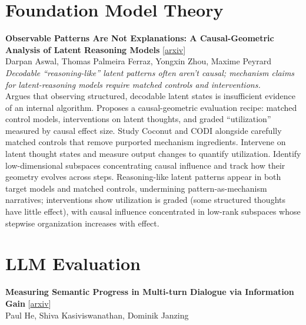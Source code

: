 \documentclass[12pt,letterpaper]{article}
\begin{document}
\medskip


\section*{Foundation Model Theory}

{\small\textbf{Observable Patterns Are Not Explanations: A Causal-Geometric Analysis of Latent Reasoning Models}} {\scriptsize[\href{https://arxiv.org/abs/2606.12689}{arxiv}]}\\
{\scriptsize Darpan Aswal, Thomas Palmeira Ferraz, Yongxin Zhou, Maxime Peyrard}\\

{\small\textit{Decodable ``reasoning-like'' latent patterns often aren't causal; mechanism claims for latent-reasoning models require matched controls and interventions.}}\\[1pt]
{\footnotesize Argues that observing structured, decodable latent states is insufficient evidence of an internal algorithm. Proposes a causal-geometric evaluation recipe: matched control models, interventions on latent thoughts, and graded ``utilization'' measured by causal effect size. Study Coconut and CODI alongside carefully matched controls that remove purported mechanism ingredients. Intervene on latent thought states and measure output changes to quantify utilization. Identify low-dimensional subspaces concentrating causal influence and track how their geometry evolves across steps. Reasoning-like latent patterns appear in both target models and matched controls, undermining pattern-as-mechanism narratives; interventions show utilization is graded (some structured thoughts have little effect), with causal influence concentrated in low-rank subspaces whose stepwise organization increases with effect.}

\medskip


\section*{LLM Evaluation}

{\small\textbf{Measuring Semantic Progress in Multi-turn Dialogue via Information Gain}} {\scriptsize[\href{https://arxiv.org/abs/2606.12332}{arxiv}]}\\
{\scriptsize Paul He, Shiva Kasiviswanathan, Dominik Janzing}\\
\end{document}
